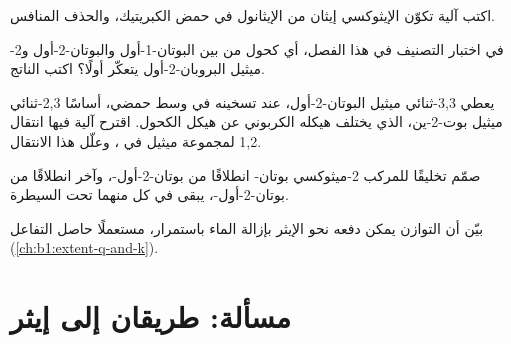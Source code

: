 \begin{exercise}[$\star\star$]\label{exo:b1:alcohol-activation:8}
اكتب آلية تكوّن الإيثوكسي إيثان من الإيثانول في
حمض الكبريتيك، والحذف المنافس.
\end{exercise}

\begin{exercise}[$\star\star$]\label{exo:b1:alcohol-activation:9}
في اختبار التصنيف في هذا الفصل، أي كحول من بين
البوتان-1-أول والبوتان-2-أول و2-ميثيل البروبان-2-أول يتعكّر أولًا؟ اكتب
الناتج.
\end{exercise}

\begin{exercise}[$\star\star\star$]\label{exo:b1:alcohol-activation:10}
يعطي 3,3-ثنائي ميثيل البوتان-2-أول، عند تسخينه في وسط حمضي، أساسًا
2,3-ثنائي ميثيل بوت-2-ين، الذي يختلف هيكله الكربوني عن هيكل
الكحول. اقترح آلية فيها انتقال 1,2 لمجموعة ميثيل في
، وعلّل هذا الانتقال.
\end{exercise}

\begin{exercise}[$\star\star\star$]\label{exo:b1:alcohol-activation:11}
صمّم تخليقًا للمركب 2-ميثوكسي بوتان- انطلاقًا من بوتان-2-أول-،
وآخر انطلاقًا من بوتان-2-أول-، يبقى  في كل منهما تحت
السيطرة.
\end{exercise}

\begin{exercise}[$\star\star\star$]\label{exo:b1:alcohol-activation:12}
بيّن أن التوازن  يمكن
دفعه نحو الإيثر بإزالة الماء باستمرار، مستعملًا حاصل
التفاعل (\cref{ch:b1:extent-q-and-k}).
\end{exercise}

\section{مسألة: طريقان إلى إيثر}

